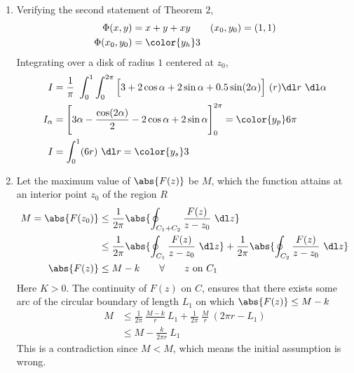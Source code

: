 \begin{enumerate}
    \item Verifying the second statement of Theorem $ 2 $,
          \begin{align}
              \Phi(x,y)      & = x + y + xy    &
              (x_0, y_0)     & = (1, 1)          \\
              \Phi(x_0, y_0) & = \color{y_h} 3
          \end{align}
          Integrating over a disk of radius $ 1 $ centered at $ z_0 $,
          \begin{align}
              I        & = \frac{1}{\pi}\ \int_{0}^{1} \int_{0}^{2\pi}
              \Big[3 + 2\cos\alpha + 2\sin \alpha + 0.5\sin(2\alpha)
              \Big]\ (r)\dl r\ \dl \alpha                                    \\
              I_\alpha & = \Bigg[ 3\alpha - \frac{\cos(2\alpha)}{2}
              - 2\cos\alpha + 2\sin\alpha \Bigg]_0^{2\pi} = \color{y_p} 6\pi \\
              I        & = \int_{0}^{1} (6r)\ \dl r = \color{y_s} 3
          \end{align}

    \item Let the maximum value of $ \abs{F(z)} $ be $ M $, which the function attains
          at an interior point $ z_0 $ of the region $ R $
          \begin{align}
              M = \abs{F(z_0)} & \leq \frac{1}{2\pi} \abs{\oint_{C_1 + C_2}
              \frac{F(z)}{z - z_0}\ \dl z}                                        \\
                               & \leq \frac{1}{2\pi} \abs{\oint_{C_1}
                  \frac{F(z)}{z - z_0}\ \dl z} + \frac{1}{2\pi} \abs{\oint_{C_2}
              \frac{F(z)}{z - z_0}\ \dl z}                                        \\
              \abs{F(z)}       & \leq M-k \qquad \forall \qquad z\ \text{on}\ C_1
          \end{align}
          Here $ K > 0 $. The continuity of $ F(z) $ on $ C $, ensures that there exists
          some arc of the circular boundary of length $ L_1 $ on which $ \abs{F(z)}
              \leq M - k $
          \begin{align}
              M & \leq \frac{1}{2\pi}\ \frac{M-k}{r}\ L_1 + \frac{1}{2\pi}
              \ \frac{M}{r}\ (2\pi r - L_1)                                \\
                & \leq M - \frac{k}{2\pi r}\ L_1
          \end{align}
          This is a contradiction since $ M < M $, which means the initial assumption is
          wrong.


\end{enumerate}
